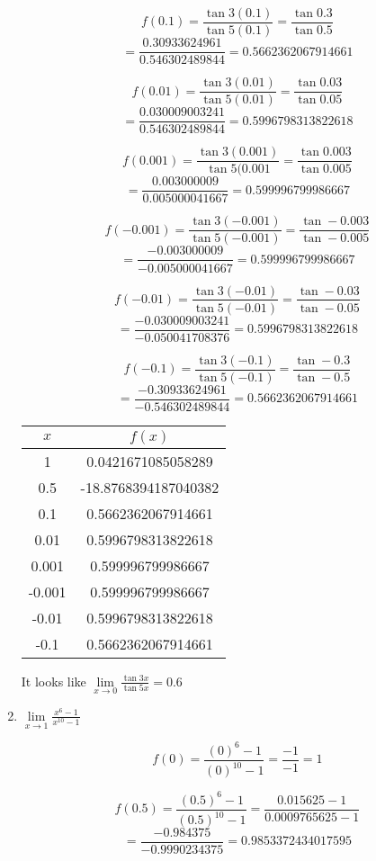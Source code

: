 \documentclass{article}
\begin{document}
\begin{enumerate}
			$$f(0.1) = \frac{\tan 3(0.1)}{\tan 5(0.1)} = \frac{\tan 0.3}{\tan 0.5} $$
			$$ = \frac{0.30933624961}{0.546302489844} = 0.5662362067914661$$
			
			$$f(0.01) = \frac{\tan 3(0.01)}{\tan 5(0.01)} = \frac{\tan 0.03}{\tan 0.05}$$
			$$ = \frac{0.030009003241}{0.546302489844} = 0.5996798313822618$$
			
			$$f(0.001) = \frac{\tan 3(0.001)}{\tan 5(0.001} = \frac{\tan 0.003}{\tan 0.005}$$
			$$ = \frac{0.003000009}{0.005000041667} = 0.599996799986667$$
			
			$$f(-0.001) = \frac{\tan 3(-0.001)}{\tan 5(-0.001)} = \frac{\tan -0.003}{\tan -0.005}$$
			$$ = \frac{-0.003000009}{-0.005000041667} = 0.599996799986667$$
			
			$$f(-0.01) = \frac{\tan 3(-0.01)}{\tan 5(-0.01)} = \frac{\tan -0.03}{\tan -0.05}$$
			$$ = \frac{-0.030009003241}{-0.050041708376} = 0.5996798313822618$$
			
			$$f(-0.1) = \frac{\tan 3(-0.1)}{\tan 5(-0.1)} = \frac{\tan -0.3}{\tan -0.5}$$
			$$ = \frac{-0.30933624961}{-0.546302489844} = 0.5662362067914661$$
			
			\begin{center}
				\begin{tabular}{|c|c|}
				\hline
				$x$ & $f(x)$ \\
				\hline \hline
				1 &  0.0421671085058289 \\
				0.5 & -18.8768394187040382 \\
				0.1 &   0.5662362067914661 \\
				0.01 &  0.5996798313822618 \\
				0.001 & 0.599996799986667 \\
				-0.001 &  0.599996799986667 \\
				-0.01 & 0.5996798313822618 \\
				-0.1 & 0.5662362067914661 \\
				\hline
				\end{tabular}
			\end{center}
			
			It looks like $\lim \limits _{x \to 0} \frac{\tan 3x}{\tan 5x} = 0.6$
			
		\item $\lim \limits _{x \to 1} \frac{x^6 - 1}{x^{10} - 1}$
		
			$$f(0) = \frac{(0)^6 - 1}{(0)^10 - 1} = \frac{-1}{-1} = 1$$
			
			$$f(0.5) = \frac{(0.5)^6 - 1}{(0.5)^10 - 1} = \frac{0.015625 - 1}{0.0009765625 - 1}$$
			$$ = \frac{-0.984375}{-0.9990234375} = 0.9853372434017595$$
			

\end{enumerate}
\end{document}
